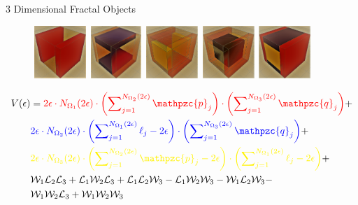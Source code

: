 \documentclass{if-beamer}
\newcommand{\SL}{\mathcal{L}}
\newcommand{\W}{\mathcal{W}}
\newcommand{\p}{\mathpzc{p}}
\newcommand{\q}{\mathpzc{q}}
\begin{document}
\begin{frame}{3 Dimensional Fractal Objects}

        \begin{figure}
            \includegraphics[height=2cm,width=2cm]{3dfractal_1.png}
            \hfill
            \includegraphics[height=2cm,width=2cm]{3dfractal_2.png}
            \hfill
            \includegraphics[height=2cm,width=2cm]{3dfractal_3.png}
            \hfill
            \includegraphics[height=2cm,width=2cm]{3dfractal_4.png}
            \hfill
            \includegraphics[height=2cm,width=2cm]{3dfractal_5}
        \end{figure}
        
        \begin{align*}
V(\epsilon) &= \textcolor{red}{2\epsilon\cdot N_{\Omega_1}(2\epsilon) \cdot \left( \sum\nolimits_{j=1}^{{N_{\Omega_2}}(2\epsilon)}\p_j \right) \cdot \left( \sum\nolimits_{j=1}^{{N_{\Omega_3}}(2\epsilon)}\q_j \right)} +\\
 &\textcolor{blue}{2\epsilon\cdot N_{\Omega_2}(2\epsilon) \cdot \left( \sum\nolimits_{j=1}^{{N_{\Omega_1}}(2\epsilon)}\ell_j - 2\epsilon \right) \cdot \left( \sum\nolimits_{j=1}^{{N_{\Omega_3}}(2\epsilon)}\q_j \right)} + \\
&\textcolor{yellow}{2\epsilon\cdot N_{\Omega_3}(2\epsilon) \cdot \left( \sum\nolimits_{j=1}^{{N_{\Omega_2}}(2\epsilon)}\p_j - 2\epsilon \right) \cdot \left( \sum\nolimits_{j=1}^{{N_{\Omega_1}}(2\epsilon)}\ell_j - 2\epsilon \right)} + \\
&\W_1\SL_2\SL_3 + \SL_1\W_2\SL_3 + \SL_1\SL_2\W_3 - \SL_1\W_2\W_3 - \W_1\SL_2\W_3 - \\
&\W_1\W_2\SL_3 + \W_1\W_2\W_3 
	\end{align*}
	
\end{frame}
\end{document}
